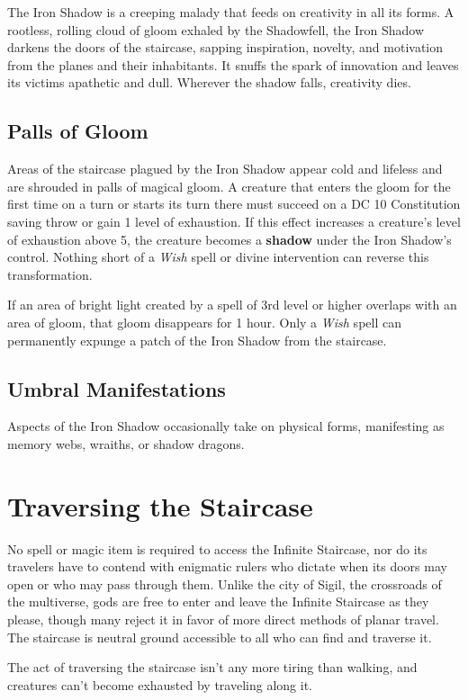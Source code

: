 \documentclass[10pt,a4paper,twoside,bg=print,twocolumn,openany,nodeprecatedcode]{dndbook}
\begin{document}
The Iron Shadow is a creeping malady that feeds on creativity in all its forms. A rootless, rolling cloud of gloom exhaled by the Shadowfell, the Iron Shadow darkens the doors of the staircase, sapping inspiration, novelty, and motivation from the planes and their inhabitants. It snuffs the spark of innovation and leaves its victims apathetic and dull. Wherever the shadow falls, creativity dies.

\subsection{Palls of Gloom}
Areas of the staircase plagued by the Iron Shadow appear cold and lifeless and are shrouded in palls of magical gloom. A creature that enters the gloom for the first time on a turn or starts its turn there must succeed on a DC 10 Constitution saving throw or gain 1 level of exhaustion. If this effect increases a creature's level of exhaustion above 5, the creature becomes a \textbf{shadow} under the Iron Shadow's control. Nothing short of a \textit{Wish} spell or divine intervention can reverse this transformation.

If an area of bright light created by a spell of 3rd level or higher overlaps with an area of gloom, that gloom disappears for 1 hour. Only a \textit{Wish} spell can permanently expunge a patch of the Iron Shadow from the staircase.

\subsection{Umbral Manifestations}
Aspects of the Iron Shadow occasionally take on physical forms, manifesting as memory webs, wraiths, or shadow dragons.

\section{Traversing the Staircase}
No spell or magic item is required to access the Infinite Staircase, nor do its travelers have to contend with enigmatic rulers who dictate when its doors may open or who may pass through them. Unlike the city of Sigil, the crossroads of the multiverse, gods are free to enter and leave the Infinite Staircase as they please, though many reject it in favor of more direct methods of planar travel. The staircase is neutral ground accessible to all who can find and traverse it.

The act of traversing the staircase isn't any more tiring than walking, and creatures can't become exhausted by traveling along it.
\end{document}
